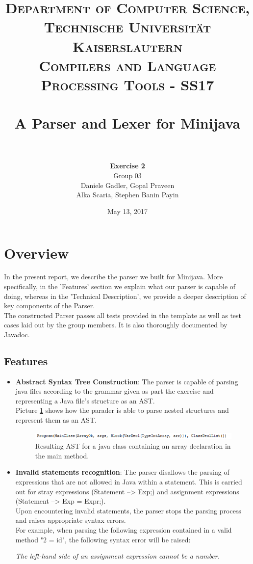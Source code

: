 \documentclass[paper=a4, fontsize=11pt]{scrartcl}
\title{
		\usefont{OT1}{bch}{b}{n}
		\normalfont \normalsize \textsc{Department of Computer Science, Technische Universit\"at Kaiserslautern\\
Compilers and Language Processing Tools - SS17
		} \\ [2pt]
		\horrule{0.5pt} \\[0.4cm]
		\huge A Parser and Lexer for Minijava\\
		\horrule{2pt} \\[0.5cm]
}
\author{	
		\textbf{Exercise 2}\\
		Group 03\\
        Daniele Gadler, Gopal Praveen\\Alka Scaria, Stephen Banin Payin \\[-1pt]		\normalsize
}
\date{May 13, 2017}
\numberwithin{equation}{section}		%
\numberwithin{figure}{section}			%
\numberwithin{table}{section}				%
\begin{document}
\maketitle

\section*{Overview}
In the present report, we describe the parser we built for Minijava. More specifically, in the 'Features' section we explain what our parser is capable of doing, whereas in the 'Technical Description', we provide a deeper description of key components of the Parser.\\
 The constructed Parser passes all tests provided in the template as well as test cases laid out by the group members. It is also thoroughly documented by Javadoc. 
\subsection*{Features}

\begin{itemize}
	\item \textbf{Abstract Syntax Tree Construction}: The parser is capable of parsing java files according to the grammar given as part the exercise and representing a Java file's structure as an AST. \\
Picture \ref{classPic} shows how the parader is able to parse nested structures and represent them as an AST.

\begin{figure}[h]
	  \includegraphics[scale=1]{class.png}
	 \caption{Resulting AST for a java class containing an array declaration in the main method.}
	 \label{classPic}
\end{figure}

	\item \textbf{Invalid statements recognition}:  The parser disallows the parsing of expressions that are not allowed in Java within a statement. This is carried out for stray expressions (Statement --> Exp;) and assignment expressions (Statement --> Exp = Expr;).\\
	 Upon encountering invalid statements, the parser stops the parsing process and raises appropriate syntax errors.\\ For example, when parsing the following expression contained in a valid method "2 = id", the following syntax error will be raised:
	 
	\textit{The left-hand side of an assignment expression cannot be a number.}

\end{itemize}
\end{document}
